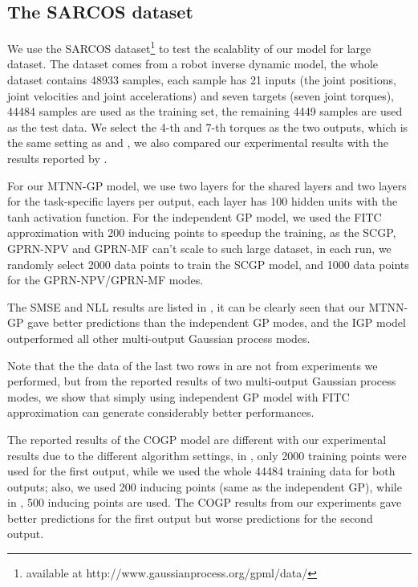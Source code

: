 \subsection{The SARCOS dataset}\label{sec:sarcos}

We use the SARCOS dataset\footnote{available at http://www.gaussianprocess.org/gpml/data/} to test the scalablity of our model for large dataset. The dataset comes from a robot inverse dynamic model, the whole dataset contains 48933 samples, each sample has 21 inputs (the joint positions, joint velocities and joint accelerations) and seven targets (seven joint torques), 44484 samples are used as the training set, the remaining 4449 samples are used as the test data. We select the 4-th and 7-th torques as the two outputs, which is the same setting as \cite{nguyen2014collaborative} and \cite{NIPS2015_5665}, we also compared our experimental results with the results reported by \cite{nguyen2014collaborative,NIPS2015_5665}.

For our MTNN-GP model, we use two layers for the shared layers and two layers for the task-specific layers per output, each layer has 100 hidden units with the tanh activation function. For the independent GP model, we used the FITC approximation with 200 inducing points to speedup the training, as the SCGP, GPRN-NPV and GPRN-MF can't scale to such large dataset, in each run, we randomly select 2000 data points to train the SCGP model, and 1000 data points for the GPRN-NPV/GPRN-MF modes.

The SMSE and NLL results are listed in , it can be clearly seen that our MTNN-GP gave better predictions than the independent GP modes, and the IGP model outperformed all other multi-output Gaussian process modes. 

Note that the the data of the last two rows in  are not from experiments we performed, but from the reported results of two multi-output Gaussian process modes\cite{nguyen2014collaborative, NIPS2015_5665}, we show that simply using independent GP model with FITC approximation can generate considerably better performances. 

The reported results of the COGP model are different with our experimental results due to the different algorithm settings, in \cite{nguyen2014collaborative}, only 2000 training points were used for the first output, while we used the whole 44484 training data for both outputs; also, we used 200 inducing points (same as the independent GP), while in \cite{nguyen2014collaborative}, 500 inducing points are used. The COGP results from our experiments gave better predictions for the first output but worse predictions for the second output.



